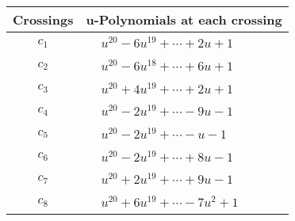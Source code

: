 \documentclass[1p]{elsarticle_modified}
\theoremstyle{definition}
\begin{document}
\begin{tabular}{m{50pt}|m{274pt}}
Crossings & \hspace{64pt}u-Polynomials at each crossing \\
\hline $$\begin{aligned}c_{1}\end{aligned}$$&$\begin{aligned}
&u^{20}-6 u^{19}+\cdots+2 u+1
\end{aligned}$\\
\hline $$\begin{aligned}c_{2}\end{aligned}$$&$\begin{aligned}
&u^{20}-6 u^{18}+\cdots+6 u+1
\end{aligned}$\\
\hline $$\begin{aligned}c_{3}\end{aligned}$$&$\begin{aligned}
&u^{20}+4 u^{19}+\cdots+2 u+1
\end{aligned}$\\
\hline $$\begin{aligned}c_{4}\end{aligned}$$&$\begin{aligned}
&u^{20}-2 u^{19}+\cdots-9 u-1
\end{aligned}$\\
\hline $$\begin{aligned}c_{5}\end{aligned}$$&$\begin{aligned}
&u^{20}-2 u^{19}+\cdots- u-1
\end{aligned}$\\
\hline $$\begin{aligned}c_{6}\end{aligned}$$&$\begin{aligned}
&u^{20}-2 u^{19}+\cdots+8 u-1
\end{aligned}$\\
\hline $$\begin{aligned}c_{7}\end{aligned}$$&$\begin{aligned}
&u^{20}+2 u^{19}+\cdots+9 u-1
\end{aligned}$\\
\hline $$\begin{aligned}c_{8}\end{aligned}$$&$\begin{aligned}
&u^{20}+6 u^{19}+\cdots-7 u^2+1
\end{aligned}$\\

\end{tabular}
\end{document}
